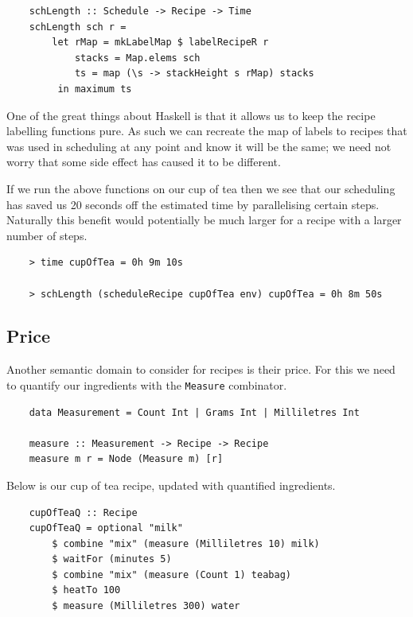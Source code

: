 \documentclass[11pt]{article}
\begin{document}
\begin{lstlisting}
    schLength :: Schedule -> Recipe -> Time
    schLength sch r =
        let rMap = mkLabelMap $ labelRecipeR r
            stacks = Map.elems sch
            ts = map (\s -> stackHeight s rMap) stacks
         in maximum ts
\end{lstlisting}

One of the great things about Haskell is that it allows us to keep the recipe labelling
functions pure. As such we can recreate the map of labels to recipes that was used in
scheduling at any point and know it will be the same; we need not worry that some side
effect has caused it to be different.

\medbreak

If we run the above functions on our cup of tea then we see that our scheduling has
saved us 20 seconds off the estimated time by parallelising certain steps. Naturally
this benefit would potentially be much larger for a recipe with a larger number of steps.

\begin{lstlisting}
    > time cupOfTea = 0h 9m 10s

    > schLength (scheduleRecipe cupOfTea env) cupOfTea = 0h 8m 50s
\end{lstlisting}

\subsection{Price}

Another semantic domain to consider for recipes is their price. For this we
need to quantify our ingredients with the \texttt{Measure} combinator.

\begin{lstlisting}
    data Measurement = Count Int | Grams Int | Milliletres Int

    measure :: Measurement -> Recipe -> Recipe
    measure m r = Node (Measure m) [r]
\end{lstlisting}

Below is our cup of tea recipe, updated with quantified ingredients.

\begin{lstlisting}
    cupOfTeaQ :: Recipe
    cupOfTeaQ = optional "milk"
        $ combine "mix" (measure (Milliletres 10) milk)
        $ waitFor (minutes 5)
        $ combine "mix" (measure (Count 1) teabag)
        $ heatTo 100
        $ measure (Milliletres 300) water
\end{lstlisting}
\end{document}
